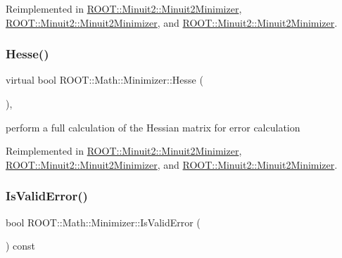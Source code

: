 Reimplemented in \mbox{\hyperlink{classROOT_1_1Minuit2_1_1Minuit2Minimizer_a0cfd04fde73c157de423705625ede51c}{R\+O\+O\+T\+::\+Minuit2\+::\+Minuit2\+Minimizer}}, \mbox{\hyperlink{classROOT_1_1Minuit2_1_1Minuit2Minimizer_a0cfd04fde73c157de423705625ede51c}{R\+O\+O\+T\+::\+Minuit2\+::\+Minuit2\+Minimizer}}, and \mbox{\hyperlink{classROOT_1_1Minuit2_1_1Minuit2Minimizer_a0cfd04fde73c157de423705625ede51c}{R\+O\+O\+T\+::\+Minuit2\+::\+Minuit2\+Minimizer}}.

\mbox{\label{classROOT_1_1Math_1_1Minimizer_ae903e5936bef4ea7fac3301f9cdc50be}} 
\subsubsection{\texorpdfstring{Hesse()}{Hesse()}\hspace{0.1cm}{\footnotesize\ttfamily [3/3]}}
{\footnotesize\ttfamily virtual bool R\+O\+O\+T\+::\+Math\+::\+Minimizer\+::\+Hesse (\begin{DoxyParamCaption}{ }\end{DoxyParamCaption})\hspace{0.3cm}{\ttfamily [inline]}, {\ttfamily [virtual]}}

perform a full calculation of the Hessian matrix for error calculation 

Reimplemented in \mbox{\hyperlink{classROOT_1_1Minuit2_1_1Minuit2Minimizer_a0cfd04fde73c157de423705625ede51c}{R\+O\+O\+T\+::\+Minuit2\+::\+Minuit2\+Minimizer}}, \mbox{\hyperlink{classROOT_1_1Minuit2_1_1Minuit2Minimizer_a0cfd04fde73c157de423705625ede51c}{R\+O\+O\+T\+::\+Minuit2\+::\+Minuit2\+Minimizer}}, and \mbox{\hyperlink{classROOT_1_1Minuit2_1_1Minuit2Minimizer_a0cfd04fde73c157de423705625ede51c}{R\+O\+O\+T\+::\+Minuit2\+::\+Minuit2\+Minimizer}}.

\mbox{\label{classROOT_1_1Math_1_1Minimizer_aac4dfcda9c3eb7e672d450c0e78c61bf}} 
\subsubsection{\texorpdfstring{IsValidError()}{IsValidError()}\hspace{0.1cm}{\footnotesize\ttfamily [1/3]}}
{\footnotesize\ttfamily bool R\+O\+O\+T\+::\+Math\+::\+Minimizer\+::\+Is\+Valid\+Error (\begin{DoxyParamCaption}{ }\end{DoxyParamCaption}) const\hspace{0.3cm}{\ttfamily [inline]}}



